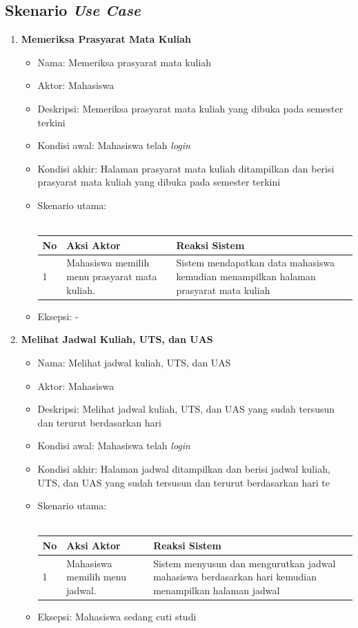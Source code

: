 \subsection{Skenario \textit{Use Case}}

\begin{enumerate}
	\item \textbf{Memeriksa Prasyarat Mata Kuliah}
		\begin{itemize}
			\item Nama: Memeriksa prasyarat mata kuliah
			\item Aktor: Mahasiswa
			\item Deskripsi: Memeriksa prasyarat mata kuliah yang dibuka pada semester terkini
			\item Kondisi awal: Mahasiswa telah \textit{login}
			\item Kondisi akhir: Halaman prasyarat mata kuliah ditampilkan dan berisi prasyarat mata kuliah yang dibuka pada semester terkini
			\item Skenario utama: \\ \\
				\begin{tabular}{|p{0.5cm} |p{6cm}| p{6cm}|}
						\hline
							No 	& Aksi Aktor & Reaksi Sistem \\ \hline
							1 	& Mahasiswa memilih menu prasyarat mata kuliah. 	&	Sistem mendapatkan data mahasiswa kemudian menampilkan halaman prasyarat mata kuliah \\ \hline 
						\end{tabular} 
			\item Eksepsi: -
		\end{itemize}
		
	\item \textbf{Melihat Jadwal Kuliah, UTS, dan UAS}
		\begin{itemize}
			\item Nama: Melihat jadwal kuliah, UTS, dan UAS
			\item Aktor: Mahasiswa
			\item Deskripsi: Melihat jadwal kuliah, UTS, dan UAS yang sudah tersusun dan terurut berdasarkan hari
			\item Kondisi awal: Mahasiswa telah \textit{login}
			\item Kondisi akhir: Halaman jadwal ditampilkan dan berisi jadwal kuliah, UTS, dan UAS yang sudah tersusun dan terurut berdasarkan hari te
			\item Skenario utama: \\ \\
				\begin{tabular}{|p{0.5cm} |p{6cm}| p{6cm}|}
						\hline
							No 	& Aksi Aktor & Reaksi Sistem \\ \hline
							1 	& Mahasiswa memilih menu jadwal. 	&	Sistem menyusun dan mengurutkan jadwal mahasiswa berdasarkan hari kemudian menampilkan halaman jadwal \\ \hline 
						\end{tabular} 
			\item Eksepsi: Mahasiswa sedang cuti studi
		\end{itemize}
		

\end{enumerate}
